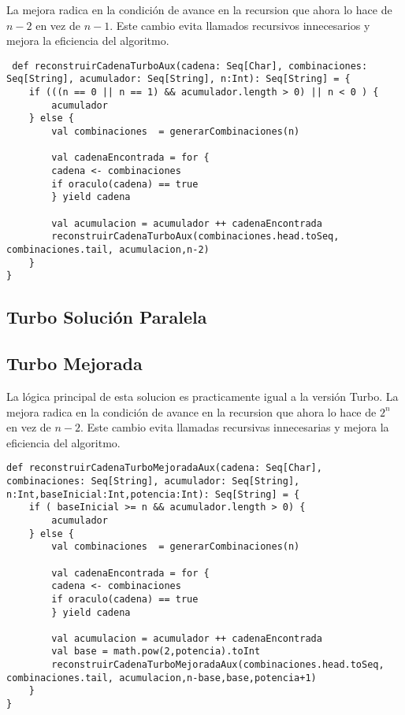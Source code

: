 \documentclass[conference]{IEEEtran}
\begin{document}
La mejora radica en la condición de avance en la recursion que ahora lo hace de $n-2$ en vez de $n-1$. Este cambio evita llamados recursivos innecesarios y mejora la eficiencia del algoritmo.

\begin{lstlisting}
 def reconstruirCadenaTurboAux(cadena: Seq[Char], combinaciones: Seq[String], acumulador: Seq[String], n:Int): Seq[String] = {
    if (((n == 0 || n == 1) && acumulador.length > 0) || n < 0 ) {
        acumulador
    } else {
        val combinaciones  = generarCombinaciones(n)
                
        val cadenaEncontrada = for {
        cadena <- combinaciones
        if oraculo(cadena) == true
        } yield cadena
            
        val acumulacion = acumulador ++ cadenaEncontrada
        reconstruirCadenaTurboAux(combinaciones.head.toSeq, combinaciones.tail, acumulacion,n-2)
    }
}
\end{lstlisting}

\subsection{\textbf{Turbo Solución Paralela}}

\subsection{\textbf{Turbo Mejorada}}
La lógica principal de esta solucion es practicamente igual a la versión Turbo. La mejora radica en la condición de avance en la recursion que ahora lo hace de $2^n$ en vez de $n-2$. Este cambio evita llamadas recursivas innecesarias y mejora la eficiencia del algoritmo.

\begin{lstlisting}
def reconstruirCadenaTurboMejoradaAux(cadena: Seq[Char], combinaciones: Seq[String], acumulador: Seq[String], n:Int,baseInicial:Int,potencia:Int): Seq[String] = {
    if ( baseInicial >= n && acumulador.length > 0) {
        acumulador
    } else {
        val combinaciones  = generarCombinaciones(n)
                
        val cadenaEncontrada = for {
        cadena <- combinaciones
        if oraculo(cadena) == true
        } yield cadena
            
        val acumulacion = acumulador ++ cadenaEncontrada
        val base = math.pow(2,potencia).toInt
        reconstruirCadenaTurboMejoradaAux(combinaciones.head.toSeq, combinaciones.tail, acumulacion,n-base,base,potencia+1)
    }
}

\end{lstlisting}
\end{document}
